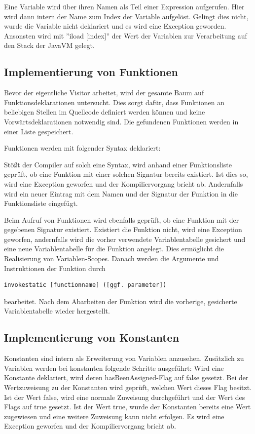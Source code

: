 Eine Variable wird über ihren Namen als Teil einer Expression aufgerufen. Hier wird dann intern der Name zum Index der Variable aufgelöst. Gelingt dies nicht, wurde die Variable nicht deklariert und es wird eine Exception geworden. Ansonsten wird mit
''iload [index]'' der Wert der Variablen zur Verarbeitung auf den Stack der JavaVM gelegt.

\subsection{Implementierung von Funktionen}
Bevor der eigentliche Visitor arbeitet, wird der gesamte Baum auf Funktionsdeklarationen untersucht. Dies sorgt dafür, dass Funktionen an beliebigen Stellen im Quellcode definiert werden können und keine Vorwärtsdeklarationen notwendig sind. Die gefundenen Funktionen werden in einer Liste gespeichert.

Funktionen werden mit folgender Syntax deklariert:

Stößt der Compiler auf solch eine Syntax, wird anhand einer Funktionsliste geprüft, ob eine Funktion mit einer solchen Signatur bereits existiert. Ist dies so, wird eine Exception geworfen und der Kompiliervorgang bricht ab. Andernfalls wird ein neuer Eintrag mit dem Namen und der Signatur der Funktion in die Funktionsliste eingefügt.

Beim Aufruf von Funktionen wird ebenfalls geprüft, ob eine Funktion mit der gegebenen Signatur existiert. Existiert die Funktion nicht, wird eine Exception geworfen, andernfalls wird die vorher verwendete Variablentabelle gesichert und eine neue Variablentabelle für die Funktion angelegt. Dies ermöglicht die Realisierung von Variablen-Scopes. Danach werden die Argumente und Instruktionen der Funktion durch
\begin{lstlisting}[frame=single]
invokestatic [functionname] ([ggf. parameter])
\end{lstlisting}
bearbeitet.
Nach dem Abarbeiten der Funktion wird die vorherige, gesicherte Variablentabelle wieder hergestellt.

\subsection{Implementierung von Konstanten}
Konstanten sind intern als Erweiterung von Variablen anzusehen. 
Zusätzlich zu Variablen werden bei konstanten folgende Schritte ausgeführt:
Wird eine Konstante deklariert, wird deren hasBeenAssigned-Flag auf false gesetzt.
Bei der Wertzuweisung zu der Konstanten wird geprüft, welchen Wert dieses Flag besitzt. Ist der Wert false, wird eine normale Zuweisung durchgeführt und der Wert des Flags auf true gesetzt. Ist der Wert true, wurde der Konstanten bereits eine Wert zugewiesen und eine weitere Zuweisung kann nicht erfolgen. Es wird eine Exception geworfen und der Kompiliervorgang bricht ab.

